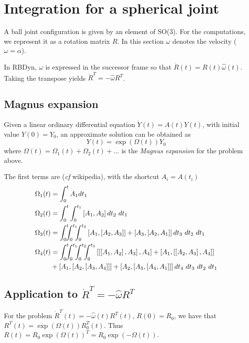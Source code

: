 \documentclass[]{article}
\newcommand{\w}{\omega}
\newcommand{\comm}[2]{\left[#1,#2\right]}
\begin{document}
\section{Integration for a spherical joint}
A ball joint configuration is given by an element of SO(3). For the computations, we represent it as a rotation matrix $R$. \newline
In this section $\w$ denotes the velocity ($\w = \alpha$).

In RBDyn, $\w$ is expressed in the successor frame so that $\dot{R}(t) = R(t) \hat{\w}(t)$. Taking the transpose yields $\dot{R}^T = - \hat{\w} R^T$.

\subsection{Magnus expansion}
Given a linear ordinary differential equation $\dot{Y}(t) = A(t) Y(t)$, with initial value $Y(0) = Y_0$, an approximate solution can be obtained as
\begin{equation}
	Y(t) = \exp(\Omega(t))Y_0
\end{equation}
where $\Omega(t) = \Omega_1(t) + \Omega_2(t) + \ldots$ is the \emph{Magnus expansion} for the problem above.

The first terms are (\emph{cf} wikipedia), with the shortcut $A_i = A(t_i)$
\begin{align}
	\Omega_1(t)& = \int_0^{t}{A_1 dt_1}\\
	\Omega_2(t)& = \int_0^{t}{\int_0^{t_1}{\comm{A_1}{A_2} dt_2}\ dt_1}\\
	\Omega_3(t)& = \int_0^{t}{\hspace{-6pt}\int_0^{t_1}{\hspace{-6pt}\int_0^{t_2}{\comm{A_1}{\comm{A_2}{A_3}} + \comm{A_3}{\comm{A_2}{A_1}} dt_3}\ dt_2}\ dt_1}\\
	\Omega_4(t)& = \int_0^{t}\hspace{-6pt}\int_0^{t_1}\hspace{-6pt}\int_0^{t_2}\hspace{-6pt}\int_0^{t_3}
		\comm{\comm{\comm{A_1}{A_2}}{A_3}}{A_4} + \comm{A_1}{\comm{\comm{A_2}{A_3}}{A_4}} \\
		& + \comm{A_1}{\comm{A_2}{\comm{A_3}{A_4}}} + \comm{A_2}{\comm{A_3}{\comm{A_4}{A_1}}}
	dt_4\ dt_3\ dt_2\ dt_1 \nonumber
\end{align}

\subsection{Application to $\dot{R}^T = - \hat{\w} R^T$}
For the problem $\dot{R}^T(t) = - \hat{\w}(t) R^T(t)$, $R(0) = R_0$, we have that $R^T(t) = \exp(\Omega(t)) R_0^T(t)$. Thus $R(t) = R_0 \exp(\Omega(t))^T = R_0  \exp(-\Omega(t))$.
\end{document}
